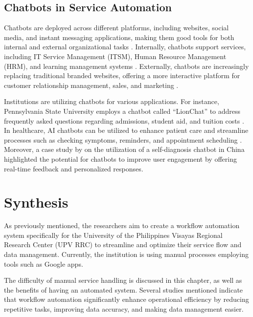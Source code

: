 \subsection{Chatbots in Service Automation}
Chatbots are deployed across different platforms, including websites, social media, and instant messaging applications, making them good tools for both internal and external organizational tasks \cite{hagberg2016, zarouali2018}. Internally, chatbots support services, including IT Service Management (ITSM), Human Resource Management (HRM), and learning management systems \cite{nawaz2019, bakouan2018}. Externally, chatbots are increasingly replacing traditional branded websites, offering a more interactive platform for customer relationship management, sales, and marketing \cite{broeck2019}.

Institutions are utilizing chatbots for various applications. For instance, Pennsylvania State University employs a chatbot called “LionChat” to address frequently asked questions regarding admissions, student aid, and tuition costs \cite{Pennstate}. In healthcare, AI chatbots can be utilized to enhance patient care and streamline processes such as checking symptoms, reminders, and appointment scheduling \cite{altamimi2023}. Moreover, a case study by \cite{fan2021} on the utilization of a self-diagnosis chatbot in China highlighted the potential for chatbots to improve user engagement by offering real-time feedback and personalized responses.


\section{Synthesis}

As previously mentioned, the researchers aim to create a workflow automation system specifically for the University of the Philippines Visayas Regional Research Center (UPV RRC) to streamline and optimize their service flow and data management. Currently, the institution is using manual processes employing tools such as Google apps.

The difficulty of manual service handling is discussed in this chapter, as well as the benefits of having an automated system. Several studies mentioned indicate that workflow automation significantly enhance operational efficiency by reducing repetitive tasks, improving data accuracy, and making data management easier.

